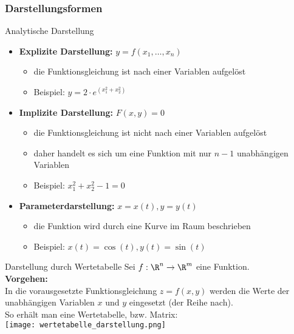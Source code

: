 \subsubsection{Darstellungsformen}

\begin{concept}{Analytische Darstellung}
    \begin{itemize}
        \item \textbf{Explizite Darstellung:} $y = f(x_1, \ldots, x_n)$
        \begin{itemize}
            \item die Funktionsgleichung ist nach einer Variablen aufgelöst
            \item Beispiel: $y = 2 \cdot e^(x_1^2 + x_2^2)$
        \end{itemize}
        \item \textbf{Implizite Darstellung:} $F(x, y) = 0$
        \begin{itemize}
            \item die Funktionsgleichung ist nicht nach einer Variablen aufgelöst
            \item daher handelt es sich um eine Funktion mit nur $n-1$ unabhängigen Variablen
            \item Beispiel: $x_1^2 + x_2^2 - 1 = 0$
        \end{itemize}
        \item \textbf{Parameterdarstellung:} $x = x(t), y = y(t)$
        \begin{itemize}
            \item die Funktion wird durch eine Kurve im Raum beschrieben
            \item Beispiel: $x(t) = \cos(t), y(t) = \sin(t)$
        \end{itemize}
    \end{itemize}
\end{concept}

\begin{concept}{Darstellung durch Wertetabelle}
    Sei $f: \R^n \to \R^m$ eine Funktion.\\
    \textbf{Vorgehen:}\\
    In die vorausgesetzte Funktionsgleichung $z = f(x,y)$ werden die Werte der unabhängigen Variablen $x$ und $y$ eingesetzt (der Reihe nach).\\
    So erhält man eine Wertetabelle, bzw. Matrix:\\
    \texttt{[image: wertetabelle\_darstellung.png]}
\end{concept}

